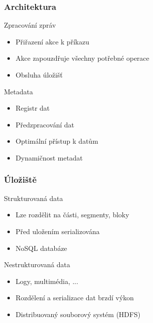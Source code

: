 \documentclass[10pt,xcolor=pdflatex]{beamer}
\begin{document}

\begin{frame}\frametitle{Architektura}
\begin{block}{Zpracování zpráv}
    \begin{itemize}
        \item Přiřazení akce k příkazu
        \item Akce zapouzdřuje všechny potřebné operace
        \item Obsluha úložišť
    \end{itemize}
\end{block}
\begin{block}{Metadata}
    \begin{itemize}
        \item Registr dat
        \item Předzpracování dat
        \item Optimální přístup k datům
        \item Dynamičnost metadat
    \end{itemize}
\end{block}
\end{frame}


\begin{frame}\frametitle{Úložiště}
\begin{block}{Strukturovaná data}
    \begin{itemize}
        \item Lze rozdělit na části, segmenty, bloky
        \item Před uložením serializována
        \item NoSQL databáze
    \end{itemize}
\end{block}
\begin{block}{Nestrukturovaná data}
    \begin{itemize}
        \item Logy, multimédia, ...
        \item Rozdělení a serializace dat brzdí výkon
        \item Distribuovaný souborový systém (HDFS)
    \end{itemize}
\end{block}
\end{frame}

\end{document}
